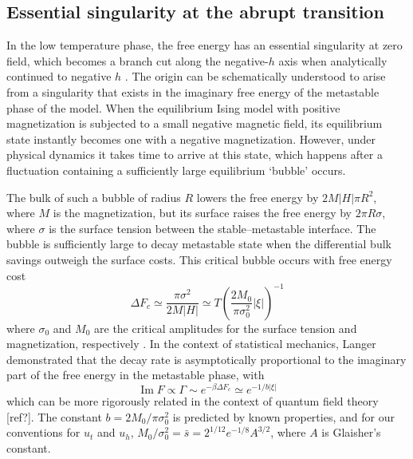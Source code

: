 \documentclass[
aps,
pre,
preprint,
longbibliography,
floatfix
]{revtex4-2}
\begin{document}
\subsection{Essential singularity at the abrupt transition}

In the low temperature phase, the free energy has an essential singularity at
zero field, which becomes a branch cut along the negative-$h$ axis when
analytically continued to negative $h$ \cite{Langer_1967_Theory}. The origin
can be schematically understood to arise from a singularity that exists in the
imaginary free energy of the metastable phase of the model. When the
equilibrium Ising model with positive magnetization is subjected to a small
negative magnetic field, its equilibrium state instantly becomes one with a
negative magnetization. However, under physical dynamics it takes time to
arrive at this state, which happens after a fluctuation containing a
sufficiently large equilibrium `bubble' occurs.

The bulk of such a bubble of radius $R$ lowers the free energy by $2M|H|\pi
R^2$, where  $M$ is the magnetization, but its surface raises the free energy
by $2\pi R\sigma$, where $\sigma$ is the surface tension between the
stable--metastable interface. The bubble is sufficiently large to decay
metastable state when the differential bulk savings outweigh the surface costs.
This critical bubble occurs with free energy cost
\begin{equation}
  \Delta F_c
    \simeq\frac{\pi\sigma^2}{2M|H|}
    \simeq T\left(\frac{2M_0}{\pi\sigma_0^2}|\xi|\right)^{-1}
\end{equation}
where $\sigma_0$ and $M_0$ are the critical amplitudes for the surface tension
and magnetization, respectively \cite{Kent-Dobias_2020_Novel}.  In the context
of statistical mechanics, Langer demonstrated that the decay rate is
asymptotically proportional to the imaginary part of the free energy in the
metastable phase, with
\begin{equation}
  \operatorname{Im}F\propto\Gamma\sim e^{-\beta\Delta F_c}\simeq e^{-1/b|\xi|}
\end{equation}
which can be more rigorously related in the context of quantum field theory
[ref?]. The constant $b=2M_0/\pi\sigma_0^2$ is predicted by known properties,
and for our conventions for $u_t$ and $u_h$, $M_0/\sigma_0^2=\bar
s=2^{1/12}e^{-1/8}A^{3/2}$, where $A$ is Glaisher's constant.
\end{document}
